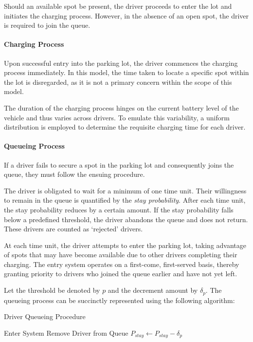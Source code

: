 Should an available spot be present, the driver proceeds to enter the lot and initiates the charging process. However, in the absence of an open spot, the driver is required to join the queue.

\paragraph{Charging Process}
Upon successful entry into the parking lot, the driver commences the charging process immediately. In this model, the time taken to locate a specific spot within the lot is disregarded, as it is not a primary concern within the scope of this model.

The duration of the charging process hinges on the current battery level of the vehicle and thus varies across drivers. To emulate this variability, a uniform distribution is employed to determine the requisite charging time for each driver.

\paragraph{Queueing Process}
If a driver fails to secure a spot in the parking lot and consequently joins the queue, they must follow the ensuing procedure.

The driver is obligated to wait for a minimum of one time unit. Their willingness to remain in the queue is quantified by the \emph{stay probability}. After each time unit, the stay probability reduces by a certain amount. If the stay probability falls below a predefined threshold, the driver abandons the queue and does not return. These drivers are counted as `rejected' drivers. 

At each time unit, the driver attempts to enter the parking lot, taking advantage of spots that may have become available due to other drivers completing their charging. The entry system operates on a first-come, first-served basis, thereby granting priority to drivers who joined the queue earlier and have not yet left.

Let the threshold be denoted by $p$ and the decrement amount by $\delta_p$. The queueing process can be succinctly represented using the following algorithm:

\begin{algorithm}
\caption{Driver Queueing Procedure}
\label{alg:entry}
\begin{algorithmic}[1]
\State Enter System
\State Remove Driver from Queue
\Else
\State $P_{stay} \gets P_{stay} - \delta_p$
\EndIf
\EndIf
\end{algorithmic}
\end{algorithm}

